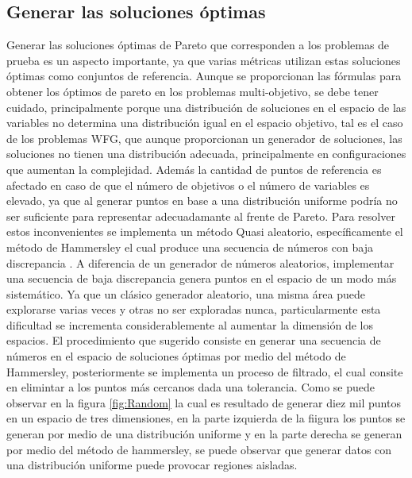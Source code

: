 \subsection{Generar las soluciones óptimas}
Generar las soluciones óptimas de Pareto que corresponden a los problemas de prueba es un aspecto importante, ya que varias métricas utilizan estas soluciones óptimas como conjuntos de referencia.
%
Aunque se proporcionan las fórmulas para obtener los óptimos de pareto en los problemas multi-objetivo, se debe tener cuidado, principalmente porque una distribución de soluciones en el espacio de las variables no determina una distribución igual en el espacio objetivo, tal es el caso de los problemas WFG, que aunque proporcionan un generador de soluciones, las soluciones no tienen una distribución adecuada, principalmente en configuraciones que aumentan la complejidad.
%
Además la cantidad de puntos de referencia es afectado en caso de que el número de objetivos o el número de variables es elevado, ya que al generar puntos en base a una distribución uniforme podría no ser suficiente para representar adecuadamante al frente de Pareto.
%
Para resolver estos inconvenientes se implementa un método Quasi aleatorio, específicamente el método de Hammersley el cual produce una secuencia de números con baja discrepancia \citep{Joel:Hammersley, Joel:AlgoritmoHungaro}.
%
A diferencia de un generador de números aleatorios, implementar una secuencia de baja discrepancia genera puntos en el espacio de un modo más sistemático.
%
Ya que un clásico generador aleatorio, una misma área puede explorarse varias veces y otras no ser exploradas nunca, particularmente esta dificultad se incrementa considerablemente al aumentar la dimensión de los espacios.
%
El procedimiento que sugerido consiste en generar una secuencia de números en el espacio de soluciones óptimas por medio del método de Hammersley, posteriormente se implementa un proceso de filtrado, el cual consite en elimintar a los puntos más cercanos dada una tolerancia. 
%
Como se puede observar en la figura \ref{fig:Random} la cual es resultado de generar diez mil puntos en un espacio de tres dimensiones, en la parte izquierda de la fiigura los puntos se generan por medio de una distribución uniforme y en la parte derecha se generan por medio del método de hammersley, se puede observar que generar datos con una distribución uniforme puede provocar regiones aisladas.

